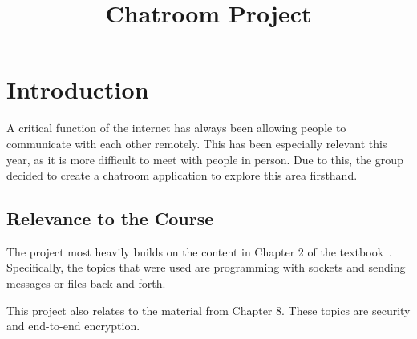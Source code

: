 \documentclass{article}
\begin{document}
\sloppy



\title{Chatroom Project}
%
\address{}


\maketitle


%
\begin{abstract}



\end{abstract}
%
%
\section{Introduction}
\label{sec:intro}
A critical function of the internet has always been allowing people to communicate with each other remotely. This has been especially relevant this year, as it is more difficult to meet with people in person. Due to this, the group decided to create a chatroom application to explore this area firsthand. 

\subsection{Relevance to the Course}

The project most heavily builds on the content in Chapter 2 of the textbook~\cite{kurose}. Specifically, the topics that were used are programming with sockets and sending messages or files back and forth. 

This project also relates to the material from Chapter 8. These topics are security and end-to-end encryption. 
\end{document}
